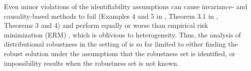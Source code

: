 Even minor violations of the identifiability assumptions can cause invariance- and causality-based methods to fail (Examples 4 and 5 in \cite{kamath2021does}, Theorem 3.1 in 
\cite{rosenfeld2020risks}, Theorems 3 and 4) and perform equally or worse than empirical risk minimization (ERM) \citep{ahuja2020empirical, gulrajani2020search, rosenfeld2022online}, which is oblivious to heterogeneity. 
Thus, the analysis of distributional robustness in the setting of  is so far limited to either finding the robust solution under the assumptions that the robustness set is identified, or impossibility results when the robustness set is not known. 







